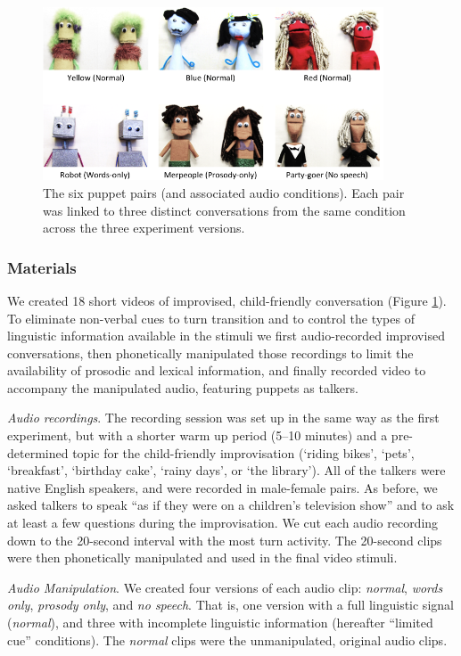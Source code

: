 \documentclass[authoryear, 12pt]{elsarticle}
\begin{document}
\begin{figure}[t]
\begin{center}
\includegraphics[width=0.9\textwidth]{figures/FIG-EN-stim.png}
\end{center}
\caption{The six puppet pairs (and associated audio conditions). Each pair was linked to three distinct conversations from the same condition across the three experiment versions.}
\label{fig:puppets}
\end{figure}

\subsubsection{Materials}
We created 18 short videos of improvised, child-friendly conversation (Figure \ref{fig:puppets}). To eliminate non-verbal cues to turn transition and to control the types of linguistic information available in the stimuli we first audio-recorded improvised conversations, then phonetically manipulated those recordings to limit the availability of prosodic and lexical information, and finally recorded video to accompany the manipulated audio, featuring puppets as talkers. 

\textit{Audio recordings}. The recording session was set up in the same way as the first experiment, but with a shorter warm up period (5--10 minutes) and a pre-determined topic for the child-friendly improvisation (`riding bikes', `pets', `breakfast', `birthday cake', `rainy days', or `the library'). All of the talkers were native English speakers, and were recorded in male-female pairs. As before, we asked talkers to speak ``as if they were on a children's television show'' and to ask at least a few questions during the improvisation. We cut each audio recording down to the 20-second interval with the most turn activity. The 20-second clips were then phonetically manipulated and used in the final video stimuli.

\textit{Audio Manipulation}. We created four versions of each audio clip: \textit{normal}, \textit{words only}, \textit{prosody only}, and \textit{no speech}. That is, one version with a full linguistic signal (\textit{normal}), and three with incomplete linguistic information (hereafter ``limited cue'' conditions). The \textit{normal} clips were the unmanipulated, original audio clips. 
\end{document}
